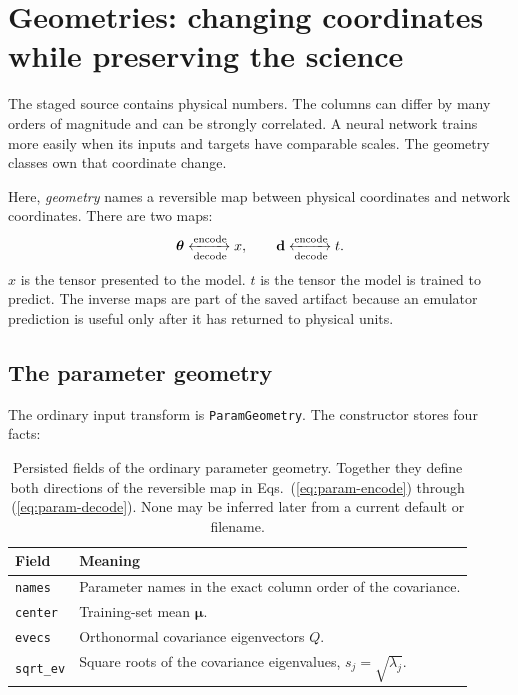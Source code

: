 \documentclass[10pt,aps,prd,twocolumn,nofootinbib]{revtex4-2}
\newcommand{\code}[1]{\texttt{#1}}
\newcommand{\btheta}{\boldsymbol{\theta}}
\newcommand{\bd}{\mathbf{d}}
\begin{document}
\section{Geometries: changing coordinates while preserving the science}
\label{chap:geometries}

The staged source contains physical numbers.  The columns can differ by many
orders of magnitude and can be strongly correlated.  A neural network trains
more easily when its inputs and targets have comparable scales.  The geometry
classes own that coordinate change.

Here, \emph{geometry} names a reversible map between physical coordinates and
network coordinates.  There are two
maps:
\begin{equation*}
  \btheta \xleftrightarrow[\text{decode}]{\text{encode}} x,
  \qquad
  \bd \xleftrightarrow[\text{decode}]{\text{encode}} t.
\end{equation*}
$x$ is the tensor presented to the model.  $t$ is the tensor the model is
trained to predict.  The inverse maps are part of the saved artifact because
an emulator prediction is useful only after it has returned to physical
units.

\subsection{The parameter geometry}

The ordinary input transform is \code{ParamGeometry}.  The constructor stores
four facts:
\begin{table}[t]
\centering
\begin{tabular}{p{}p{}}
\toprule
Field & Meaning \\
\midrule
\code{names} & Parameter names in the exact column order of the covariance.  \\
\code{center} & Training-set mean $\boldsymbol\mu$.  \\
\code{evecs} & Orthonormal covariance eigenvectors $Q$.  \\
\code{sqrt\_ev} & Square roots of the covariance eigenvalues,
                   $s_j=\sqrt{\lambda_j}$.  \\
\bottomrule
\end{tabular}
\caption{Persisted fields of the ordinary parameter geometry.  Together they
define both directions of the reversible map in
Eqs.~(\ref{eq:param-encode}) through (\ref{eq:param-decode}).  None may be inferred
later from a current default or filename.}
\label{tab:param-geometry-fields}
\end{table}
\end{document}
